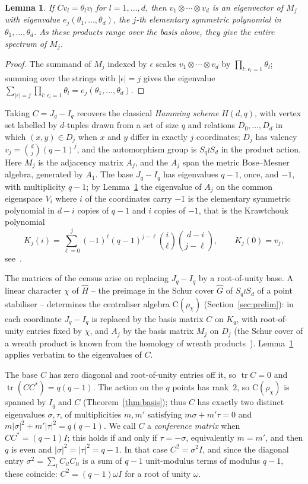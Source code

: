 \documentclass{article}
\newtheorem{lemma}[theorem]{Lemma}
\theoremstyle{definition}
\theoremstyle{remark}
\newcommand{\Cr}{\mathrm{C}}
\begin{document}
\begin{lemma}\label{lem:basis-eigenvalues}
If $Cv_l=\theta_l v_l$ for $l=1,\dots,d$, then $v_1\otimes\cdots\otimes v_d$ is an
eigenvector of $M_j$ with eigenvalue $e_j(\theta_1,\dots,\theta_d)$, the $j$-th
elementary symmetric polynomial in $\theta_1,\dots,\theta_d$.  As these products
range over the basis above, they give the entire spectrum of $M_j$.
\end{lemma}

\begin{proof}
The summand of $M_j$ indexed by $\epsilon$ scales $v_1\otimes\cdots\otimes v_d$ by
$\prod_{l:\,\epsilon_l=1}\theta_l$; summing over the strings with $|\epsilon|=j$
gives the eigenvalue $\sum_{|\epsilon|=j}\prod_{l:\,\epsilon_l=1}\theta_l
=e_j(\theta_1,\dots,\theta_d)$.
\end{proof}

Taking $C=J_q-I_q$ recovers the classical \emph{Hamming scheme} $H(d,q)$, with
vertex set labelled by $d$-tuples drawn from a set of size $q$ and relations $D_0,\dots,D_d$ in which $(x,y)\in D_j$ when $x$
and $y$ differ in exactly $j$ coordinates; $D_j$ has valency
$v_j=\binom{d}{j}(q-1)^j$, and the automorphism group is $S_q\wr S_d$ in the
product action.  Here $M_j$ is the adjacency matrix $A_j$, and the $A_j$ span the
metric Bose--Mesner algebra, generated by $A_1$.  The base $J_q-I_q$ has
eigenvalues $q-1$, once, and $-1$, with multiplicity $q-1$; by
Lemma~\ref{lem:basis-eigenvalues} the eigenvalue of $A_j$ on the common
eigenspace $V_i$ where $i$ of the coordinates carry $-1$ is the elementary
symmetric polynomial in $d-i$ copies of $q-1$ and $i$ copies of $-1$, that is the
Krawtchouk polynomial
\[
  K_j(i)=\sum_{\ell=0}^{j}(-1)^{\ell}(q-1)^{j-\ell}\binom{i}{\ell}\binom{d-i}{j-\ell},
  \qquad K_j(0)=v_j,
\]
see~\cite{BCN}.

The matrices of the census arise on replacing $J_q-I_q$ by a root-of-unity base.
A linear character $\chi$ of $\widehat H$ -- the preimage in the Schur cover
$\widehat G$ of $S_q\wr S_d$ of a point stabiliser -- determines the centraliser
algebra $\Cr(\rho_\chi)$ (Section~\ref{sec:prelim}): in each coordinate $J_q-I_q$
is replaced by the basis matrix $C$ on $K_q$, with root-of-unity entries fixed by
$\chi$, and $A_j$ by the basis matrix $M_j$ on $D_j$ (the Schur cover of a wreath
product is known from the homology of wreath products~\cite{Karpilovsky}).
Lemma~\ref{lem:basis-eigenvalues} applies verbatim to the eigenvalues of $C$.

The base $C$ has zero diagonal and root-of-unity entries off it, so
$\operatorname{tr}C=0$ and $\operatorname{tr}(CC^*)=q(q-1)$.  The action on the
$q$ points has rank~$2$, so $\Cr(\rho_\chi)$ is spanned by $I_q$ and $C$
(Theorem~\ref{thm:basis}); thus $C$ has exactly two distinct eigenvalues
$\sigma,\tau$, of multiplicities $m,m'$ satisfying $m\sigma+m'\tau=0$ and
$m|\sigma|^2+m'|\tau|^2=q(q-1)$.  We call $C$ a \emph{conference matrix} when
$CC^*=(q-1)I$; this holds if and only if $\tau=-\sigma$, equivalently $m=m'$, and
then $q$ is even and $|\sigma|^2=|\tau|^2=q-1$.  In that case $C^2=\sigma^2I$, and
since the diagonal entry $\sigma^2=\sum_l C_{il}C_{li}$ is a sum of $q-1$
unit-modulus terms of modulus $q-1$, these coincide: $C^2=(q-1)\omega I$ for a
root of unity $\omega$.
\end{document}
